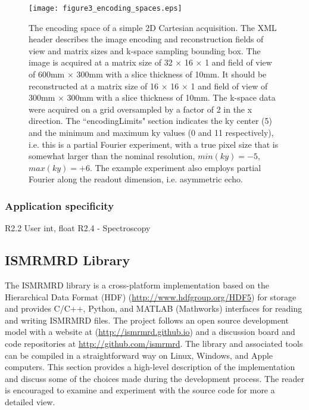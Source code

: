 \documentclass[12pt, draft]{article}
\newcommand{\madded}[2][None]{\added[remark=#1]{#2}}
\begin{document}
\begin{figure}
\begin{center}
\texttt{[image: figure3\_encoding\_spaces.eps]}
\caption{The encoding space of a simple 2D Cartesian acquisition.  The XML header describes the image encoding and reconstruction fields of view and matrix sizes and k-space sampling bounding box.  The image is acquired at a matrix size of 32 $\times$ 16 $\times$ 1 and field of view of 600mm $\times$ 300mm with a slice thickness of 10mm.  It should be reconstructed at a matrix size of 16 $\times$ 16 $\times$ 1 and field of view of 300mm $\times$ 300mm with a slice thickness of 10mm.   The k-space data were acquired on a grid oversampled by a factor of 2 in the x direction.  The ``encodingLimits" section indicates the ky center (5) and the minimum and maximum ky values (0 and 11 respectively), i.e. this is a partial Fourier experiment, with a true pixel size that is somewhat larger than the nominal resolution, $min(ky)=-5$, $max(ky)=+6$. The example experiment also employs partial Fourier along the readout dimension, i.e. asymmetric echo.}
\label{fig:encoding}
\end{center}
\end{figure}

\subsubsection*{Application specificity}
R2.2 User int, float
R2.4 - Spectroscopy

\subsection*{ISMRMRD Library}
The ISMRMRD library is a cross-platform implementation based on the \madded[R2.18]{domain-independent} Hierarchical Data Format (HDF) (\url{http://www.hdfgroup.org/HDF5}) for storage and provides C/C++, Python, and MATLAB (Mathworks) interfaces for reading and writing ISMRMRD files.  The project follows an open source development model with a website at (\url{http://ismrmrd.github.io}) and a discussion board and code repositories at \url{http://github.com/ismrmrd}.  The library and associated tools can be compiled in a straightforward way on Linux, Windows, and Apple computers.  This section provides a high-level description of the implementation and discuss some of the choices made during the development process.  The reader is encouraged to examine and experiment with the source code for more a detailed view.
\end{document}
